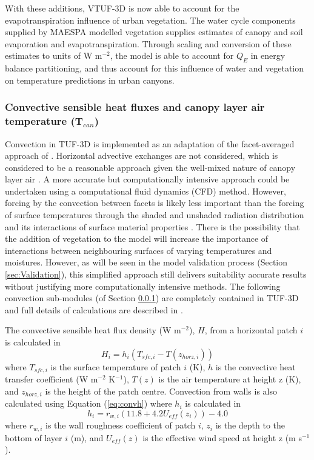 \documentclass[final,3p,times,authoryear]{elsarticle}
\begin{document}
With these additions, VTUF-3D is now able to account for the evapotranspiration influence of urban vegetation. The water cycle components supplied by MAESPA modelled vegetation supplies estimates of canopy and soil evaporation and evapotranspiration. Through scaling and conversion of these estimates to units of W m$^{-2}$, the model is able to account for $Q_{E}$ in energy balance partitioning, and thus account for this influence of water and vegetation on temperature predictions in urban canyons.


\subsubsection{Convective sensible heat fluxes and canopy layer air temperature (T$_{can}$)}\label{sec:convection} 
Convection in TUF-3D is implemented as an adaptation of the facet-averaged approach of \cite{Masson2000}. Horizontal advective exchanges are not considered, which is considered to be a reasonable approach given the well-mixed nature of canopy layer air \citep{Krayenhoff2007}. A more accurate but computationally intensive approach could be undertaken using a computational fluid dynamics (CFD) method. However, forcing by the convection between facets is likely less important than the forcing of surface temperatures through the shaded and unshaded radiation distribution and its interactions of surface material properties \citep{Krayenhoff2007}. There is the possibility that the addition of vegetation to the model will increase the importance of interactions between neighbouring surfaces of varying temperatures and moistures. However, as will be seen in the model validation process (Section \ref{sec:Validation}), this simplified approach still delivers suitability accurate results without justifying more computationally intensive methods. The following convection sub-modules (of Section \ref{sec:convection}) are completely contained in TUF-3D and full details of calculations are described in \cite{Krayenhoff2007}.

The convective sensible heat flux density (W m$^{-2}$), $H$, from a horizontal patch $i$ is calculated in 
\begin{equation} 
H_{i} = h_{i} (T_{sfc,i}-T(z_{horz,i}))
\label{eq:convh} \end{equation} 
where $T_{sfc,i}$ is the surface temperature of patch $i$ (K),
$h$ is the convective heat transfer coefficient (W m$^{-2}$ K$^{-1}$), 
$T(z)$ is the air temperature at height z (K), and 
$z_{horz,i}$ is the height of the patch centre. Convection from walls is also calculated using Equation (\ref{eq:convh}) where $h_{i}$ is calculated in 
\begin{equation} 
h_{i} = r_{w,i}(11.8+4.2 U_{eff}(z_{i}))-4.0
\label{eq:convw} \end{equation} 
where 
$r_{w,i}$ is the wall roughness coefficient of patch $i$,
$z_{i}$ is the depth to the bottom of layer $i$ (m), and
$U_{eff}(z)$ is the effective wind speed at height z (m s$^{-1}$).
\end{document}
